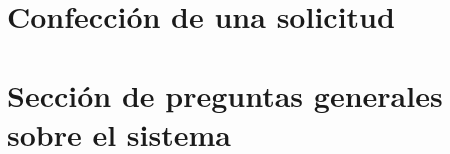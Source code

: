 \documentclass{iccmemoria}
\begin{document}
%









\appendixpart

\label{sec: Anexo_A}
	\section{Confección de una solicitud}
	
	
	
	

\label{sec: Anexo_B}

	\section{Sección de preguntas generales sobre el sistema}
	
	
	


\end{document}
